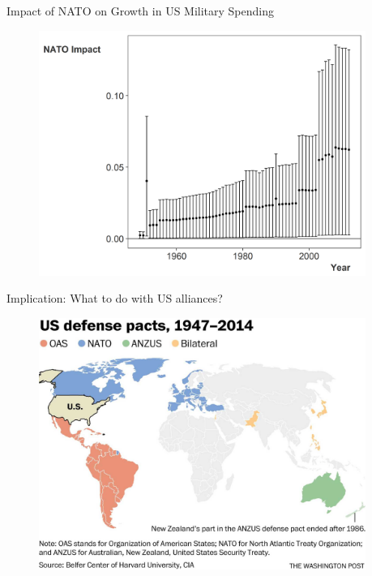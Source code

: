 \documentclass[12pt]{beamer}
\begin{document}

\begin{frame}{Impact of NATO on Growth in US Military Spending} 

\begin{figure}
	\centering
		\includegraphics[width=0.95\textwidth]{nato-imp-us.png}
\end{figure}

\end{frame}




\begin{frame}{Implication: What to do with US alliances?}

\begin{figure}[htbp]
	\centering
		\includegraphics[width=0.95\textwidth]{nato-map.jpg}
\end{figure}


\end{frame}
\end{document}
